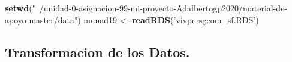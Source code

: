 \documentclass[11pt,]{article}
\newenvironment{Shaded}{\begin{snugshade}}{\end{snugshade}}
\newcommand{\KeywordTok}[1]{\textcolor[rgb]{0.13,0.29,0.53}{\textbf{#1}}}
\newcommand{\DataTypeTok}[1]{\textcolor[rgb]{0.13,0.29,0.53}{#1}}
\newcommand{\DecValTok}[1]{\textcolor[rgb]{0.00,0.00,0.81}{#1}}
\newcommand{\StringTok}[1]{\textcolor[rgb]{0.31,0.60,0.02}{#1}}
\newcommand{\OperatorTok}[1]{\textcolor[rgb]{0.81,0.36,0.00}{\textbf{#1}}}
\newcommand{\NormalTok}[1]{#1}
\begin{document}
\begin{Shaded}
\begin{Highlighting}[]
\KeywordTok{setwd}\NormalTok{(}\StringTok{"~/unidad-0-asignacion-99-mi-proyecto-Adalbertogp2020/material-de-apoyo-master/data"}\NormalTok{)}
\NormalTok{munad19 <-}\StringTok{ }\KeywordTok{readRDS}\NormalTok{(}\StringTok{'vivpersgeom_sf.RDS'}\NormalTok{)}
\end{Highlighting}
\end{Shaded}

\subsection{Transformacion de los
Datos.}\label{transformacion-de-los-datos.}

\begin{Shaded}
\end{Shaded}
\end{document}
